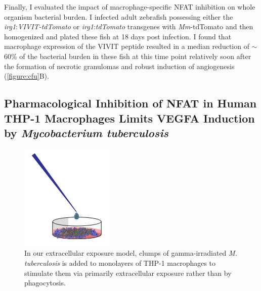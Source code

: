 Finally, I evaluated the impact of macrophage\hyp{}specific NFAT inhibition on whole organism bacterial burden. I infected adult zebrafish possessing either the \textit{irg1}:\textit{VIVIT\hyp{}tdTomato} or \textit{irg1}:\textit{tdTomato} transgenes with \textit{Mm}\hyp{}tdTomato and then homogenized and plated these fish at 18 days post infection. I found that macrophage expression of the VIVIT peptide resulted in a median reduction of ${\sim}$60\% of the bacterial burden in these fish at this time point relatively soon after the formation of necrotic granulomas and robust induction of angiogenesis (\autoref{figure:cfu}B).
 
\subsection{Pharmacological Inhibition of NFAT in Human \mbox{THP\hyp{}1} Macrophages Limits VEGFA Induction by \textit{Mycobacterium tuberculosis}}\label{thp1inca}

\begin{figure}
\centering
\includegraphics[height=2in]{images/gammamtbthp1model.pdf}
\caption[Model of extracellular exposure of $\upgamma$-\textit{Mtb} to THP-1 macrophages]{In our extracellular exposure model, clumps of gamma\hyp{}irradiated \textit{M. tuberculosis} is added to monolayers of THP\hyp{}1 macrophages to stimulate them via primarily extracellular exposure rather than by phagocytosis.}
\label{figure:exposure}
\end{figure}

